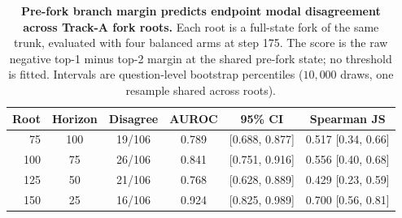 \begin{table}[t]
\centering
\small
\caption{\textbf{Pre-fork branch margin predicts endpoint modal disagreement across Track-A fork roots.} Each root is a full-state fork of the same trunk, evaluated with four balanced arms at step 175. The score is the raw negative top-1 minus top-2 margin at the shared pre-fork state; no threshold is fitted. Intervals are question-level bootstrap percentiles ($10{,}000$ draws, one resample shared across roots).}
\label{tab:trackA-instability-horizons}
\begin{tabular}{rccccc}
\toprule
Root & Horizon & Disagree & AUROC & 95\% CI & Spearman JS \\
\midrule
75 & 100 & 19/106 & 0.789 & [0.688, 0.877] & 0.517 [0.34, 0.66] \\
100 & 75 & 26/106 & 0.841 & [0.751, 0.916] & 0.556 [0.40, 0.68] \\
125 & 50 & 21/106 & 0.768 & [0.628, 0.889] & 0.429 [0.23, 0.59] \\
150 & 25 & 16/106 & 0.924 & [0.825, 0.989] & 0.700 [0.56, 0.81] \\
\bottomrule
\end{tabular}
\end{table}
